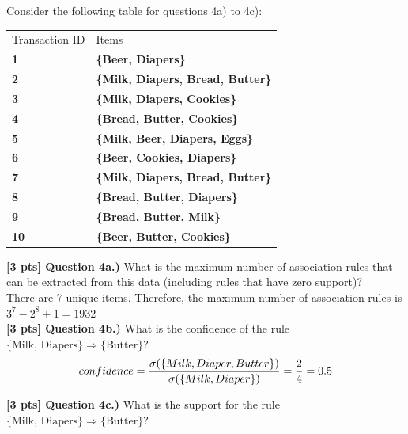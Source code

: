 \documentclass[paper=a4, fontsize=11pt]{scrartcl} %
\begin{document}
Consider the following table for questions 4a) to 4c):\\
\begin{center}
\begin{tabular}{ll}
Transaction ID & Items \\
\rowcolor[HTML]{DEEBF6} 
\textbf{1}     & \textbf{\{Beer, Diapers\}} \\
\rowcolor[HTML]{DEEBF6} 
\textbf{2}     & \textbf{\{Milk, Diapers, Bread, Butter\}} \\
\rowcolor[HTML]{DEEBF6} 
\textbf{3}     & \textbf{\{Milk, Diapers, Cookies\}} \\
\rowcolor[HTML]{DEEBF6} 
\textbf{4}     & \textbf{\{Bread, Butter, Cookies\}} \\
\rowcolor[HTML]{DEEBF6} 
\textbf{5}     & \textbf{\{Milk, Beer, Diapers, Eggs\}} \\
\rowcolor[HTML]{DEEBF6} 
\textbf{6}     & \textbf{\{Beer, Cookies, Diapers\}} \\
\rowcolor[HTML]{DEEBF6} 
\textbf{7}     & \textbf{\{Milk, Diapers, Bread, Butter\}} \\
\rowcolor[HTML]{DEEBF6} 
\textbf{8}     & \textbf{\{Bread, Butter, Diapers\}} \\
\rowcolor[HTML]{DEEBF6} 
\textbf{9}     & \textbf{\{Bread, Butter, Milk\}} \\
\rowcolor[HTML]{DEEBF6} 
\textbf{10}    & \textbf{\{Beer, Butter, Cookies\}}    
\end{tabular}
\end{center}

\vspace{8mm}

\textbf{[3 pts] Question 4a.)} What is the maximum number of association rules that can be extracted from this data (including rules that have zero support)? \\
There are 7 unique items. Therefore, the maximum number of association rules is $3^7 - 2^8 +1=1932$\\

\textbf{[3 pts] Question 4b.)} What is the confidence of the rule $\{ \text{Milk, Diapers} \} \Rightarrow \{ \text{Butter} \}$? \\
$$
confidence=\frac{\sigma(\{Milk,Diaper,Butter\})}{\sigma(\{Milk,Diaper\})}\\
=\frac{2}{4}=0.5
$$


\textbf{[3 pts] Question 4c.)} What is the support for the rule $\{ \text{Milk, Diapers} \} \Rightarrow \{ \text{Butter} \}$? \\
\end{document}
